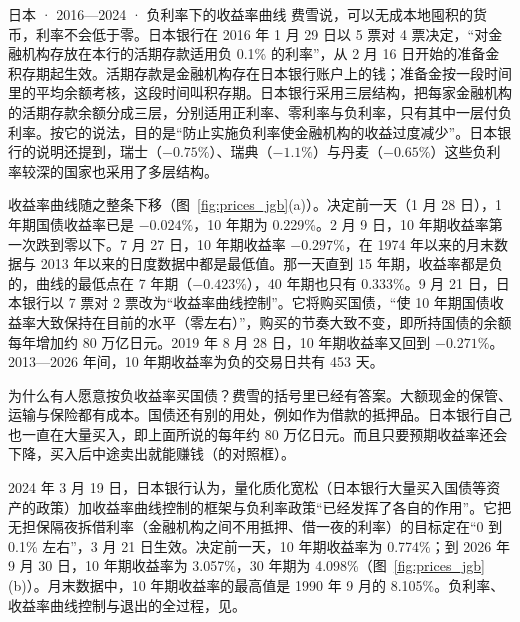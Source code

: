 \begin{case}{日本 · 2016—2024 · 负利率下的收益率曲线}
费雪说，可以无成本地囤积的货币，利率不会低于零。日本银行在 2016 年 1 月 29 日以 5 票对 4 票决定，“对金融机构存放在本行的活期存款适用负 0.1\% 的利率”，从 2 月 16 日开始的准备金积存期起生效\cite{boj2016a}。活期存款是金融机构存在日本银行账户上的钱；准备金按一段时间里的平均余额考核，这段时间叫积存期。日本银行采用三层结构，把每家金融机构的活期存款余额分成三层，分别适用正利率、零利率与负利率，只有其中一层付负利率。按它的说法，目的是“防止实施负利率使金融机构的收益过度减少”\cite{boj2016a}。日本银行的说明还提到，瑞士（$-0.75\%$）、瑞典（$-1.1\%$）与丹麦（$-0.65\%$）这些负利率较深的国家也采用了多层结构\cite{boj2016a}。

收益率曲线随之整条下移（图~\ref{fig:prices_jgb}(a)）。决定前一天（1 月 28 日），1 年期国债收益率已是 $-0.024\%$，10 年期为 0.229\%\cite{mof2026}。2 月 9 日，10 年期收益率第一次跌到零以下。7 月 27 日，10 年期收益率 $-0.297\%$，在 1974 年以来的月末数据与 2013 年以来的日度数据中都是最低值。那一天直到 15 年期，收益率都是负的，曲线的最低点在 7 年期（$-0.423\%$），40 年期也只有 0.333\%。9 月 21 日，日本银行以 7 票对 2 票改为“收益率曲线控制”。它将购买国债，“使 10 年期国债收益率大致保持在目前的水平（零左右）”，购买的节奏大致不变，即所持国债的余额每年增加约 80 万亿日元\cite{boj2016b}。2019 年 8 月 28 日，10 年期收益率又回到 $-0.271\%$。2013—2026 年间，10 年期收益率为负的交易日共有 453 天。

为什么有人愿意按负收益率买国债？费雪的括号里已经有答案。大额现金的保管、运输与保险都有成本。国债还有别的用处，例如作为借款的抵押品。日本银行自己也一直在大量买入，即上面所说的每年约 80 万亿日元。而且只要预期收益率还会下降，买入后中途卖出就能赚钱（的对照框）。

2024 年 3 月 19 日，日本银行认为，量化质化宽松（日本银行大量买入国债等资产的政策）加收益率曲线控制的框架与负利率政策“已经发挥了各自的作用”。它把无担保隔夜拆借利率（金融机构之间不用抵押、借一夜的利率）的目标定在“0 到 0.1\% 左右”，3 月 21 日生效\cite{boj2024}。决定前一天，10 年期收益率为 0.774\%；到 2026 年 9 月 30 日，10 年期收益率为 3.057\%，30 年期为 4.098\%（图~\ref{fig:prices_jgb}(b)）。月末数据中，10 年期收益率的最高值是 1990 年 9 月的 8.105\%。负利率、收益率曲线控制与退出的全过程，见。
\end{case}


